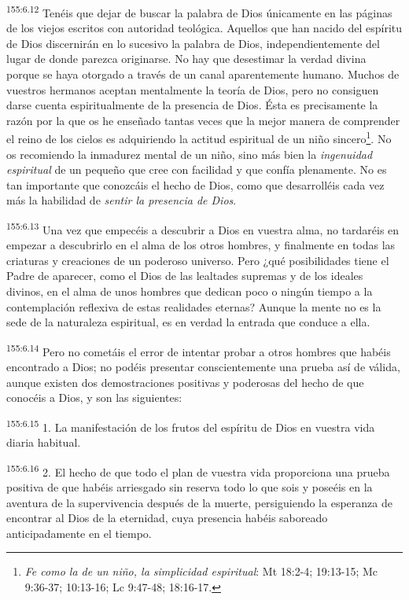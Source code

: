 \par
\textsuperscript{155:6.12} Tenéis que dejar de buscar la palabra de Dios únicamente en las páginas de los viejos escritos con autoridad teológica. Aquellos que han nacido del espíritu de Dios discernirán en lo sucesivo la palabra de Dios, independientemente del lugar de donde parezca originarse. No hay que desestimar la verdad divina porque se haya otorgado a través de un canal aparentemente humano. Muchos de vuestros hermanos aceptan mentalmente la teoría de Dios, pero no consiguen darse cuenta espiritualmente de la presencia de Dios. Ésta es precisamente la razón por la que os he enseñado tantas veces que la mejor manera de comprender el reino de los cielos es adquiriendo la actitud espiritual de un niño sincero\footnote{\textit{Fe como la de un niño, la simplicidad espiritual}: Mt 18:2-4; 19:13-15; Mc 9:36-37; 10:13-16; Lc 9:47-48; 18:16-17.}. No os recomiendo la inmadurez mental de un niño, sino más bien la \textit{ingenuidad espiritual} de un pequeño que cree con facilidad y que confía plenamente. No es tan importante que conozcáis el hecho de Dios, como que desarrolléis cada vez más la habilidad de \textit{sentir la presencia de Dios}.

\par
\textsuperscript{155:6.13} Una vez que empecéis a descubrir a Dios en vuestra alma, no tardaréis en empezar a descubrirlo en el alma de los otros hombres, y finalmente en todas las criaturas y creaciones de un poderoso universo. Pero ¿qué posibilidades tiene el Padre de aparecer, como el Dios de las lealtades supremas y de los ideales divinos, en el alma de unos hombres que dedican poco o ningún tiempo a la contemplación reflexiva de estas realidades eternas? Aunque la mente no es la sede de la naturaleza espiritual, es en verdad la entrada que conduce a ella.

\par
\textsuperscript{155:6.14} Pero no cometáis el error de intentar probar a otros hombres que habéis encontrado a Dios; no podéis presentar conscientemente una prueba así de válida, aunque existen dos demostraciones positivas y poderosas del hecho de que conocéis a Dios, y son las siguientes:

\par
\textsuperscript{155:6.15} 1. La manifestación de los frutos del espíritu de Dios en vuestra vida diaria habitual.

\par
\textsuperscript{155:6.16} 2. El hecho de que todo el plan de vuestra vida proporciona una prueba positiva de que habéis arriesgado sin reserva todo lo que sois y poseéis en la aventura de la supervivencia después de la muerte, persiguiendo la esperanza de encontrar al Dios de la eternidad, cuya presencia habéis saboreado anticipadamente en el tiempo.

